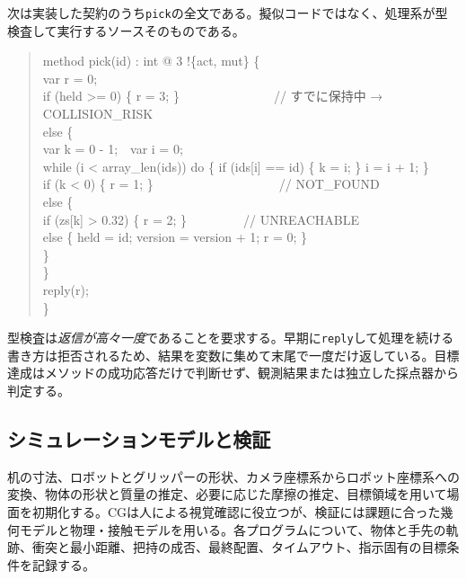 \documentclass[10pt,letterpaper]{article}
\begin{document}
次は実装した契約のうち\texttt{pick}の全文である。擬似コードではなく、処理系が型検査して実行するソースそのものである。
\begin{quote}\codefont\footnotesize
method pick(id) : int @ 3 !\{act, mut\} \{\\
\hspace*{1em}var r = 0;\\
\hspace*{1em}if (held >= 0) \{ r = 3; \}~~~~~~~~~~~~~~~// すでに保持中 → COLLISION\_RISK\\
\hspace*{1em}else \{\\
\hspace*{2em}var k = 0 - 1;~~var i = 0;\\
\hspace*{2em}while (i < array\_len(ids)) do \{ if (ids[i] == id) \{ k = i; \} i = i + 1; \}\\
\hspace*{2em}if (k < 0) \{ r = 1; \}~~~~~~~~~~~~~~~~~~~~// NOT\_FOUND\\
\hspace*{2em}else \{\\
\hspace*{3em}if (zs[k] > 0.32) \{ r = 2; \}~~~~~~~~~// UNREACHABLE\\
\hspace*{3em}else \{ held = id; version = version + 1; r = 0; \}\\
\hspace*{2em}\}\\
\hspace*{1em}\}\\
\hspace*{1em}reply(r);\\
\}
\end{quote}
型検査は\emph{返信が高々一度}であることを要求する。早期に\texttt{reply}して処理を続ける書き方は拒否されるため、結果を変数に集めて末尾で一度だけ返している。目標達成はメソッドの成功応答だけで判断せず、観測結果または独立した採点器から判定する。

\subsection{シミュレーションモデルと検証}
机の寸法、ロボットとグリッパーの形状、カメラ座標系からロボット座標系への変換、物体の形状と質量の推定、必要に応じた摩擦の推定、目標領域を用いて場面を初期化する。CGは人による視覚確認に役立つが、検証には課題に合った幾何モデルと物理・接触モデルを用いる。各プログラムについて、物体と手先の軌跡、衝突と最小距離、把持の成否、最終配置、タイムアウト、指示固有の目標条件を記録する。
\end{document}

